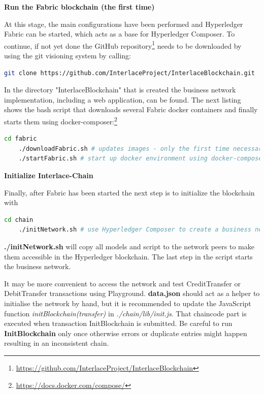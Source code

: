 \textbf{Run the Fabric blockchain (the first time)}

At this stage, the main configurations have been performed and Hyperledger Fabric can be started, which acts as a base for Hyperledger Composer. To continue, if not yet done the GitHub repository\footnote{\url{https://github.com/InterlaceProject/InterlaceBlockchain}} needs to be downloaded by using the git visioning system by calling:

\begin{lstlisting}[language=bash]
	git clone https://github.com/InterlaceProject/InterlaceBlockchain.git
\end{lstlisting}

In the directory "InterlaceBlockchain" that is created the business network implementation, including a web application, can be found. The next listing shows the bash script that downloads several Fabric docker containers and finally starts them using docker-composer:\footnote{\url{https://docs.docker.com/compose/}}

\begin{lstlisting}[language=bash]
	cd fabric
	./downloadFabric.sh # updates images - only the first time necessary
	./startFabric.sh # start up docker environment using docker-compose
\end{lstlisting}




\textbf{Initialize Interlace-Chain}

Finally, after Fabric has been started the next step is to initialize the blockchain with

\begin{lstlisting}[language=bash]
	cd chain
	./initNetwork.sh # use Hyperledger Composer to create a business network and deploy it
\end{lstlisting}

\textbf{./initNetwork.sh} will copy all models and script to the network peers to make them accessible in the Hyperledger blockchain. The last step in the script starts the business network.

It may be more convenient to access the network and test CreditTransfer or DebitTransfer transactions using Playground. \textbf{data.json} should act as a helper to initialise the network by hand, but it is recommended to update the JavaScript function \textit{initBlockchain(transfer)} in \textit{./chain/lib/init.js}. That chaincode part is executed when transaction InitBlockchain is submitted. Be careful to run \textbf{InitBlockchain} only once otherwise errors or duplicate entries might happen resulting in an inconsistent chain.


